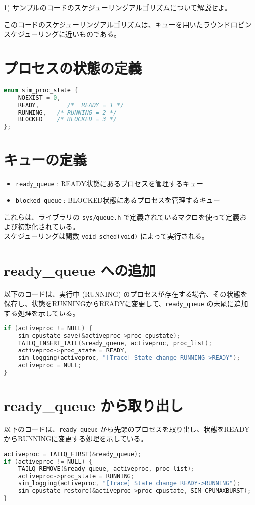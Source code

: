 \documentclass{article}
\begin{document}
1) サンプルのコードのスケジューリングアルゴリズムについて解説せよ。

このコードのスケジューリングアルゴリズムは、キューを用いたラウンドロビンスケジューリングに近いものである。

\section*{プロセスの状態の定義}
\begin{lstlisting}[language=C]
enum sim_proc_state {
    NOEXIST = 0,
    READY,        /*  READY = 1 */
    RUNNING,   /* RUNNING = 2 */
    BLOCKED    /* BLOCKED = 3 */
};
\end{lstlisting}

\section*{キューの定義}
\begin{itemize}
    \item \texttt{ready\_queue} : READY状態にあるプロセスを管理するキュー
    \item \texttt{blocked\_queue} : BLOCKED状態にあるプロセスを管理するキュー
\end{itemize}
これらは、ライブラリの \texttt{sys/queue.h} で定義されているマクロを使って定義および初期化されている。\\
スケジューリングは関数 \texttt{void sched(void)} によって実行される。

\section*{ready\_queue への追加}
以下のコードは、実行中 (RUNNING) のプロセスが存在する場合、その状態を保存し、状態をRUNNINGからREADYに変更して、\texttt{ready\_queue} の末尾に追加する処理を示している。
\begin{lstlisting}[language=C]
if (activeproc != NULL) {
    sim_cpustate_save(&activeproc->proc_cpustate);
    TAILQ_INSERT_TAIL(&ready_queue, activeproc, proc_list);
    activeproc->proc_state = READY;
    sim_logging(activeproc, "[Trace] State change RUNNING->READY");
    activeproc = NULL;
}
\end{lstlisting}

\section*{ready\_queue から取り出し}
以下のコードは、\texttt{ready\_queue} から先頭のプロセスを取り出し、状態をREADYからRUNNINGに変更する処理を示している。
\begin{lstlisting}[language=C]
activeproc = TAILQ_FIRST(&ready_queue);
if (activeproc != NULL) {
    TAILQ_REMOVE(&ready_queue, activeproc, proc_list);
    activeproc->proc_state = RUNNING;
    sim_logging(activeproc, "[Trace] State change READY->RUNNING");
    sim_cpustate_restore(&activeproc->proc_cpustate, SIM_CPUMAXBURST);
}
\end{lstlisting}
\end{document}
